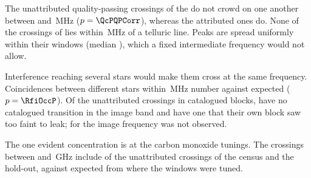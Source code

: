 The \QcNQP{} unattributed quality-passing crossings of the \NtSetUnName{} do not crowd on one
another between \QcTolLo{} and \QcTolHi\,MHz ($p=\QcPQPCorr$), whereas the
attributed ones do. None of the
\TlNCross{} crossings of \TlCrossPop{} lies within \ScRadMHz\,MHz of a
telluric line. Peaks are spread uniformly within their windows (median
\RfiFracMed), which a fixed intermediate frequency would not allow.

Interference reaching several stars would make them cross at the same
frequency. Coincidences between different stars within \RfiOccTol\,MHz number
\RfiOccObs{} against \RfiOccNull{} expected ($p=\RfiOccP$). Of the
\ImNScreen{} unattributed crossings in catalogued blocks, \ImNNoParent{} have
no catalogued transition in the image band and \ImNParentAbsent{} have one that
their own block saw too faint to leak; for \ImNLeft{} the image frequency was not
observed.

The one evident concentration is at the carbon monoxide
tunings. The \TlBandAll{} crossings between \TlBandLo{} and \TlBandHi\,GHz
include \TlBandObs{} of the \TlBandNSub{} unattributed crossings of the
census and the hold-out, against \TlBandNull{} expected from where the
windows were tuned.
